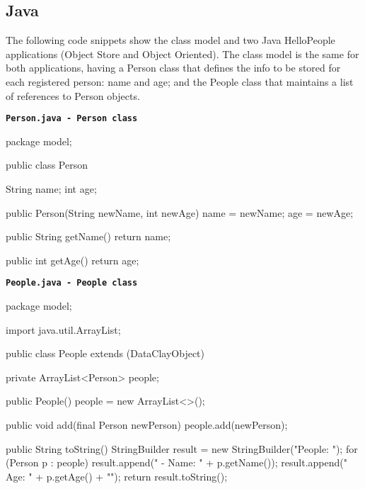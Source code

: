 \subsection{Java}
\label{sec:JavaFirstApp}

The following code snippets show the class model and two Java HelloPeople applications (Object Store and Object Oriented). The class model is the same for both applications, having a Person class that defines the info to be stored for each registered person: name and age; and the People class that maintains a list of references to Person objects.

\begin{tBox}
\texttt{\bfseries\textcolor{basecolor}{Person.java - Person class}}
\begin{java}
package model;

public class Person {
    String name;
    int age;
  
    public Person(String newName, int newAge) {
        name = newName;
        age = newAge;
    }
  
    public String getName() {
        return name;
    }
  
    public int getAge() {
        return age;
    }
}
\end{java}
\end{tBox}

\begin{tBox}
\texttt{\bfseries\textcolor{basecolor}{People.java - People class}}
\begin{java}
package model;

import java.util.ArrayList;

public class People extends (DataClayObject) {
    private ArrayList<Person> people;

    public People() {
        people = new ArrayList<>();
    }

    public void add(final Person newPerson) {
        people.add(newPerson);
    }

    public String toString() {
        StringBuilder result = new StringBuilder("People: \n");
        for (Person p : people) {
            result.append(" - Name: " + p.getName());
            result.append(" Age: " + p.getAge() + "\n");
        }
        return result.toString();
    }
}
\end{java}
\end{tBox}



